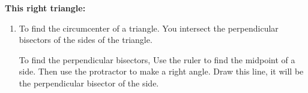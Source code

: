 \documentclass[nooutcomes,noauthor,hints,handout]{ximera}
\begin{document}
\begin{question}
\begin{enumerate}
          \newpage
         
        \textbf{This right triangle:}

          \vspace{2.5in}

          
          \begin{center}
          \end{center}
    
  \end{enumerate}
  \begin{freeResponse}
    \begin{enumerate}
      \item To find the circumcenter of a triangle. You intersect the
        perpendicular bisectors of the sides of the triangle.

        To find the perpendicular bisectors, Use the ruler to find the
        midpoint of a side. Then use the protractor to make a right
        angle. Draw this line, it will be the perpendicular bisector
        of the side.



\end{enumerate}
\end{freeResponse}
\end{question}
\end{document}
